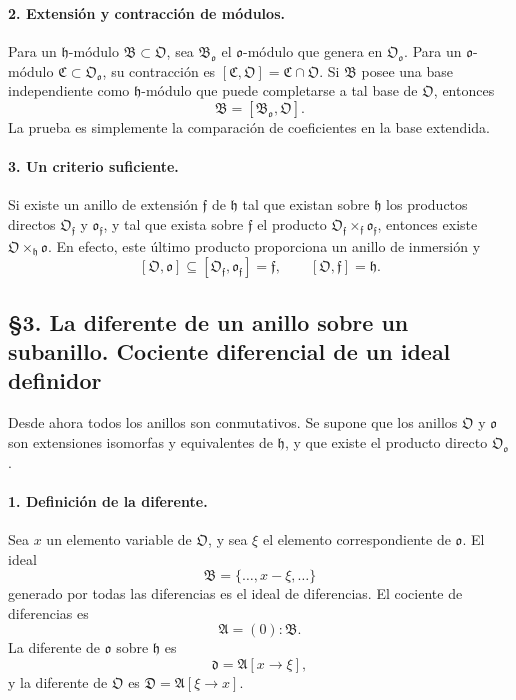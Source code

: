 \documentclass[11pt]{article}
\begin{document}
\paragraph{2. Extensión y contracción de módulos.}
Para un $\mathfrak h$-módulo $\mathfrak B\subset\mathfrak O$, sea $\mathfrak B_{\mathfrak o}$ el $\mathfrak o$-módulo que genera en $\mathfrak O_{\mathfrak o}$. Para un $\mathfrak o$-módulo $\mathfrak C\subset\mathfrak O_{\mathfrak o}$, su contracción es $[\mathfrak C,\mathfrak O]=\mathfrak C\cap\mathfrak O$. Si $\mathfrak B$ posee una base independiente como $\mathfrak h$-módulo que puede completarse a tal base de $\mathfrak O$, entonces
\[
        \mathfrak B=[\mathfrak B_{\mathfrak o},\mathfrak O].
\]
La prueba es simplemente la comparación de coeficientes en la base extendida.

\paragraph{3. Un criterio suficiente.}
Si existe un anillo de extensión $\mathfrak f$ de $\mathfrak h$ tal que existan sobre $\mathfrak h$ los productos directos $\mathfrak O_{\mathfrak f}$ y $\mathfrak o_{\mathfrak f}$, y tal que exista sobre $\mathfrak f$ el producto $\mathfrak O_{\mathfrak f}\times_{\mathfrak f}\mathfrak o_{\mathfrak f}$, entonces existe $\mathfrak O\times_{\mathfrak h}\mathfrak o$. En efecto, este último producto proporciona un anillo de inmersión y
\[
        [\mathfrak O,\mathfrak o]\subseteq [\mathfrak O_{\mathfrak f},\mathfrak o_{\mathfrak f}]=\mathfrak f,
        \qquad [\mathfrak O,\mathfrak f]=\mathfrak h.
\]

\subsection*{§3. La diferente de un anillo sobre un subanillo. Cociente diferencial de un ideal definidor}

Desde ahora todos los anillos son conmutativos. Se supone que los anillos $\mathfrak O$ y $\mathfrak o$ son extensiones isomorfas y equivalentes de $\mathfrak h$, y que existe el producto directo $\mathfrak O_{\mathfrak o}$.

\paragraph{1. Definición de la diferente.}
Sea $x$ un elemento variable de $\mathfrak O$, y sea $\xi$ el elemento correspondiente de $\mathfrak o$. El ideal
\[
        \mathfrak B=\{\ldots,x-\xi,\ldots\}
\]
generado por todas las diferencias es el ideal de diferencias. El cociente de diferencias es
\[
        \mathfrak A=(0):\mathfrak B.
\]
La diferente de $\mathfrak o$ sobre $\mathfrak h$ es
\[
        \mathfrak d=\mathfrak A[x\to\xi],
\]
y la diferente de $\mathfrak O$ es $\mathfrak D=\mathfrak A[\xi\to x]$.
\end{document}
